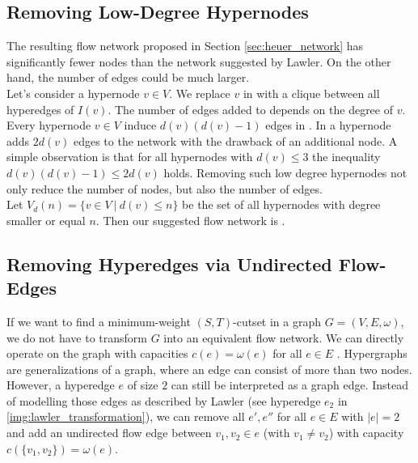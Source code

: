 \subsection{Removing Low-Degree Hypernodes}
\label{sec:degree_network}

The resulting flow network  proposed in Section \ref{sec:heuer_network} has significantly
fewer nodes than the network  suggested by Lawler. On the other hand, the number of
edges could be much larger. \\
Let's consider a hypernode $v \in V$. We replace $v$ in  with a clique between all
hyperedges of $I(v)$. The number of edges added to  depends on the degree of
$v$. Every hypernode $v \in V$ induce $d(v)(d(v) - 1)$ edges in . In  a hypernode adds $2d(v)$ edges to the network with the drawback
of an additional node. A simple observation is that for all hypernodes with $d(v) \le 3$ the inequality
$d(v)(d(v) - 1) \le 2d(v)$ holds. Removing such low degree hypernodes not only reduce
the number of nodes, but also the number of edges. \\
Let $V_{d}(n) = \{v \in V\ |\ d(v) \le n\}$ be the set of all hypernodes
with degree smaller or equal $n$. Then our suggested flow network is .

\subsection{Removing Hyperedges via Undirected Flow-Edges}
\label{sec:edge_size_network}

If we want to find a minimum-weight $(S,T)$-cutset in a graph $G = (V,E,\omega)$, we do not have to transform
$G$ into an equivalent flow network. We can directly operate on the graph with capacities
$c(e) = \omega(e)$ for all $e \in E$ \cite{ford1956maximal}. Hypergraphs are generalizations of a graph, where
an edge can consist of more than two nodes. However, a hyperedge $e$ of size $2$ can still be 
interpreted as a graph edge. Instead of modelling those edges as described by Lawler \cite{lawler1973}
(see hyperedge $e_2$ in \autoref{img:lawler_transformation}), we can remove all $e',e''$ for all $e \in E$
with $|e| = 2$ and add an undirected flow edge between $v_1,v_2 \in e$ (with $v_1 \neq v_2$) with
capacity $c(\{v_1,v_2\}) = \omega(e)$.

